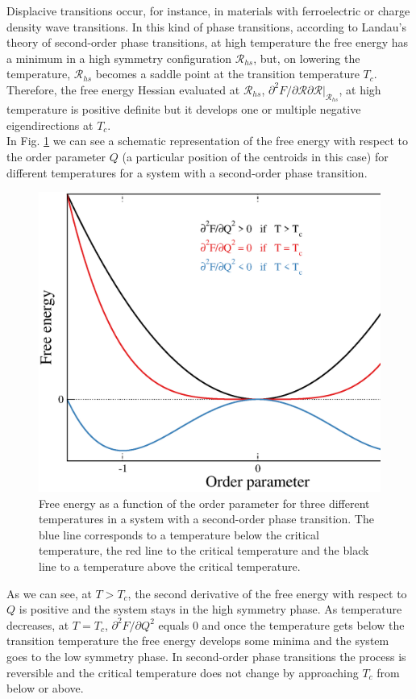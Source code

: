 Displacive transitions occur, for instance, in materials with ferroelectric or charge density wave transitions. In this kind of phase transitions, according to Landau's theory of second-order phase 
transitions\cite{lifshitz1980landau}, at high temperature the free energy has a minimum in a high symmetry configuration $\boldsymbol{\mathcal{R}}_{hs}$, but, on lowering the temperature, $\boldsymbol{\mathcal{R}}_{hs}$ 
becomes a saddle point at the transition temperature $T_{c}$. Therefore, the free energy Hessian evaluated at $\boldsymbol{\mathcal{R}}_{hs}$, $\partial^{2}F/\partial\boldsymbol{\mathcal{R\partial\boldsymbol{\mathcal{
R}}}}|_{\boldsymbol{\mathcal{R}}_{hs}}$, at high temperature is positive definite but it develops one or multiple negative eigendirections at $T_{c}$. \\

In Fig. \ref{transition} we can see a schematic representation of the free energy with respect to the order parameter $Q$ (a particular position of the centroids in this case) for different temperatures for a system with a 
second-order phase transition.
\begin{figure}[h]
\begin{center}
\includegraphics[width=0.8\linewidth]{Figures/data.eps}
\caption[Free energy as a function of temperature in a second-order phase transition]{Free energy as a function of the order parameter for three different temperatures in a system with a second-order phase transition. The 
blue line corresponds to a temperature below the critical temperature, the red line to the critical temperature and the black line to a temperature above the critical temperature.}
\label{transition}
\end{center}
\end{figure}
As we can see, at $T>T_{c}$, the second derivative of the free energy with respect to $Q$ is positive and the system stays in the high symmetry phase. As temperature decreases, at $T=T_{c}$, $\partial^{2}F/\partial Q^{2}$ equals 
$0$ and once the temperature gets below the transition temperature the free energy develops some minima and the system goes to the low symmetry phase. In second-order phase transitions the process is reversible and the critical 
temperature does not change by approaching $T_{c}$ from below or above. \\

